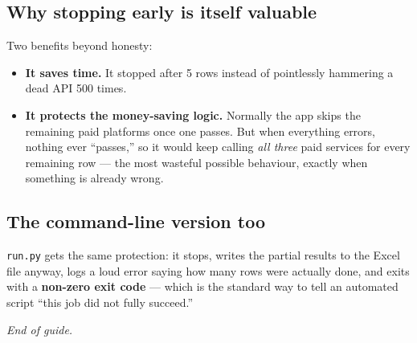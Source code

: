 \documentclass[11pt]{article}
\newcommand{\file}[1]{\texttt{\color{inkdark}#1}}
\begin{document}
\subsection{Why stopping early is itself valuable}

Two benefits beyond honesty:
\begin{itemize}
  \item \textbf{It saves time.} It stopped after 5 rows instead of pointlessly
  hammering a dead API 500 times.
  \item \textbf{It protects the money-saving logic.} Normally the app skips the
  remaining paid platforms once one passes. But when everything errors, nothing
  ever ``passes,'' so it would keep calling \emph{all three} paid services for
  every remaining row — the most wasteful possible behaviour, exactly when
  something is already wrong.
\end{itemize}

\subsection{The command-line version too}

\file{run.py} gets the same protection: it stops, writes the partial results to
the Excel file anyway, logs a loud error saying how many rows were actually
done, and exits with a \textbf{non-zero exit code} — which is the standard way
to tell an automated script ``this job did not fully succeed.''

\vspace{1cm}
\begin{center}
\color{inkgray}\emph{End of guide.}
\end{center}
\end{document}
